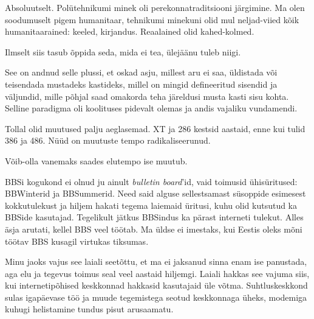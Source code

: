 
Absoluutselt. Polütehnikumi minek oli perekonnatraditsiooni järgimine. Ma olen soodumuselt pigem humanitaar, tehnikumi minekuni olid mul neljad-viied kõik humanitaarained: 
keeled, kirjandus. Reaalained olid kahed-kolmed.

Ilmselt siis tasub õppida seda, mida ei tea, ülejäänu tuleb niigi. 

See on andnud selle plussi, et oskad 
asju, millest aru ei saa, üldistada või teisendada mustadeks 
kastideks, millel on mingid defineeritud sisendid ja väljundid, mille põhjal 
saad omakorda teha järeldusi musta kasti sisu kohta. 
Selline paradigma oli koolituses pidevalt olemas ja andis vajaliku vundamendi.


Tollal olid muutused palju aeglasemad. XT 
ja 286 kestsid aastaid, enne kui tulid 386 ja 486. Nüüd on 
muutuste tempo radikaliseerunud.


Võib-olla vanemaks saades elutempo ise muutub.


BBSi kogukond ei olnud ju ainult \emph{bulletin board}'id, 
vaid toimusid ühisüritused: BBWinterid ja 
BBSummerid. Need said alguse sellestsamast 
süsoppide esimesest kokkutulekust ja hiljem hakati tegema laiemaid üritusi, kuhu olid kutsutud ka BBSide kasutajad. Tegelikult jätkus BBSindus ka pärast
interneti tulekut. Alles äsja arutati, kellel 
BBS veel töötab. Ma üldse ei imestaks, kui Eestis oleks mõni töötav BBS 
kusagil virtukas tiksumas. 

Minu jaoks vajus see laiali seetõttu, et ma ei 
jaksanud sinna enam ise panustada, aga elu ja tegevus toimus seal veel 
aastaid hiljemgi. Laiali hakkas see vajuma siis, kui 
internetipõhised keskkonnad hakkasid kasutajaid üle võtma. 
Suhtluskeskkond sulas igapäevase töö ja muude tegemistega seotud keskkonnaga 
üheks, modemiga kuhugi helistamine tundus pisut arusaamatu.


